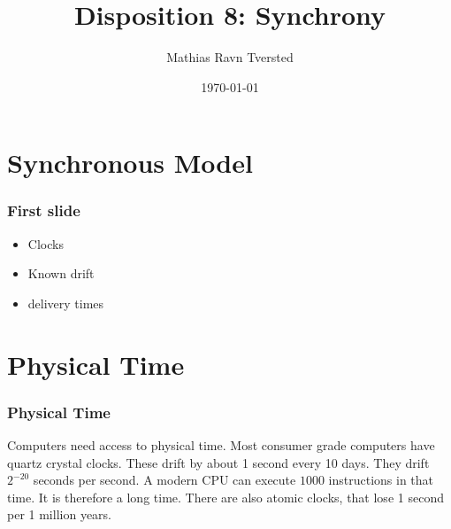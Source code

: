 \documentclass[14pt]{beamer}
\title{Disposition 8: Synchrony}
\author{Mathias Ravn Tversted}
\date{\today}
\begin{document}
\frame{\titlepage} 







\section{Synchronous Model}
        \begin{frame}
            \frametitle{First slide}
                \begin{itemize}
                    \item Clocks
                    \item Known drift
                    \item delivery times
                \end{itemize}    
        
        \end{frame}
\section{Physical Time}
        \begin{frame}
            \frametitle{Physical Time}   
            Computers need access to physical time. Most consumer grade computers have quartz crystal clocks. These drift by about 1 second every 10 days. They drift $2^{-20}$ seconds per second. A modern CPU can execute $1000$ instructions in that time. It is therefore a long time. There are also atomic clocks, that lose 1 second per 1 million years. 
        \end{frame}
\end{document}
